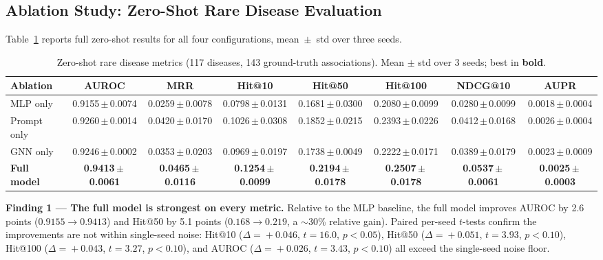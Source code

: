 \documentclass[conference]{IEEEtran}
\begin{document}
\subsection{Ablation Study: Zero-Shot Rare Disease Evaluation}
\label{sec:ablation}

Table~\ref{tab:zeroshot_ablation} reports full zero-shot results for all four configurations, mean~$\pm$~std over three seeds.

\begin{table}[t]
\centering
\caption{Zero-shot rare disease metrics (117 diseases, 143 ground-truth associations). Mean $\pm$ std over 3 seeds; best in \textbf{bold}.}
\label{tab:zeroshot_ablation}
\footnotesize
\setlength{\tabcolsep}{4pt}
\begin{tabular}{@{}lccccccc@{}}
\toprule
\textbf{Ablation} & \textbf{AUROC} & \textbf{MRR} & \textbf{Hit@10} & \textbf{Hit@50} & \textbf{Hit@100} & \textbf{NDCG@10} & \textbf{AUPR} \\
\midrule
MLP only        & 0.9155\,$\pm$\,0.0074 & 0.0259\,$\pm$\,0.0078 & 0.0798\,$\pm$\,0.0131 & 0.1681\,$\pm$\,0.0300 & 0.2080\,$\pm$\,0.0099 & 0.0280\,$\pm$\,0.0099 & 0.0018\,$\pm$\,0.0004 \\
Prompt only     & 0.9260\,$\pm$\,0.0014 & 0.0420\,$\pm$\,0.0170 & 0.1026\,$\pm$\,0.0308 & 0.1852\,$\pm$\,0.0215 & 0.2393\,$\pm$\,0.0226 & 0.0412\,$\pm$\,0.0168 & 0.0026\,$\pm$\,0.0004 \\
GNN only        & 0.9246\,$\pm$\,0.0002 & 0.0353\,$\pm$\,0.0203 & 0.0969\,$\pm$\,0.0197 & 0.1738\,$\pm$\,0.0049 & 0.2222\,$\pm$\,0.0171 & 0.0389\,$\pm$\,0.0179 & 0.0023\,$\pm$\,0.0009 \\
\textbf{Full model} & \textbf{0.9413\,$\pm$\,0.0061} & \textbf{0.0465\,$\pm$\,0.0116} & \textbf{0.1254\,$\pm$\,0.0099} & \textbf{0.2194\,$\pm$\,0.0178} & \textbf{0.2507\,$\pm$\,0.0178} & \textbf{0.0537\,$\pm$\,0.0061} & \textbf{0.0025\,$\pm$\,0.0003} \\
\bottomrule
\end{tabular}
\end{table}

\textbf{Finding 1 --- The full model is strongest on every metric.}
Relative to the MLP baseline, the full model improves AUROC by 2.6 points ($0.9155 \rightarrow 0.9413$) and Hit@50 by 5.1 points ($0.168 \rightarrow 0.219$, a $\sim$30\% relative gain). Paired per-seed $t$-tests confirm the improvements are not within single-seed noise: Hit@10 ($\Delta\!=\!+0.046$, $t\!=\!16.0$, $p\!<\!0.05$), Hit@50 ($\Delta\!=\!+0.051$, $t\!=\!3.93$, $p\!<\!0.10$), Hit@100 ($\Delta\!=\!+0.043$, $t\!=\!3.27$, $p\!<\!0.10$), and AUROC ($\Delta\!=\!+0.026$, $t\!=\!3.43$, $p\!<\!0.10$) all exceed the single-seed noise floor.
\end{document}
